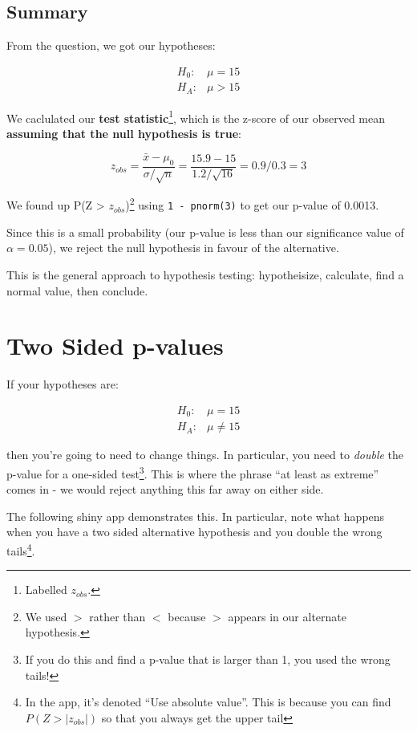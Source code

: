 \documentclass[
  letterpaper,
  DIV=11,
  numbers=noendperiod,
  oneside]{scrreprt}
\begin{document}
\hypertarget{summary-5}{%
\subsection{Summary}\label{summary-5}}

From the question, we got our hypotheses:\vspace{-7mm}

\begin{align*}
H_0: &\mu = 15\\
H_A: &\mu > 15
\end{align*}

We caclulated our \textbf{test statistic}\footnote{Labelled \(z_{obs}\).},
which is the z-score of our observed mean \textbf{assuming that the null
hypothesis is true}:

\[ z_{obs} = \frac{\bar x - \mu_0}{\sigma/\sqrt{n}}  = \frac{15.9 - 15}{1.2/\sqrt{16}} = 0.9/0.3 = 3\]

We found up P(Z \textgreater{} \(z_{obs}\))\footnote{We used \(>\)
  rather than \(<\) because \(>\) appears in our alternate hypothesis.}
using \texttt{1\ -\ pnorm(3)} to get our p-value of 0.0013.

Since this is a small probability (our p-value is less than our
significance value of \(\alpha = 0.05\)), we reject the null hypothesis
in favour of the alternative.

This is the general approach to hypothesis testing: hypotheisize,
calculate, find a normal value, then conclude.

\hypertarget{two-sided-p-values}{%
\section{Two Sided p-values}\label{two-sided-p-values}}

If your hypotheses are: \vspace{-4mm}

\begin{align*}
H_0: &\mu = 15\\
H_A: &\mu \ne 15
\end{align*}

then you're going to need to change things. In particular, you need to
\emph{double} the p-value for a one-sided test\footnote{If you do this
  and find a p-value that is larger than 1, you used the wrong tails!}.
This is where the phrase ``at least as extreme'' comes in - we would
reject anything this far away on either side.

The following shiny app demonstrates this. In particular, note what
happens when you have a two sided alternative hypothesis and you double
the wrong tails\footnote{In the app, it's denoted ``Use absolute
  value''. This is because you can find \(P(Z > |z_{obs}|)\) so that you
  always get the upper tail}.
\end{document}

